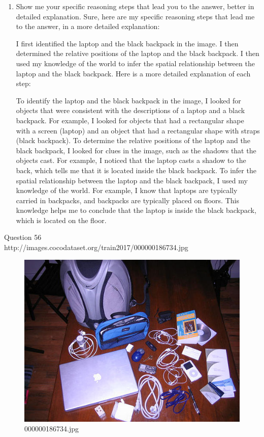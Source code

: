 \begin{enumerate}
    Here are some additional details about the spatial relationship between the laptop and the black backpack:
    
    The laptop is a computer that is used for work, school, and entertainment.
    The black backpack is a bag that is used to carry personal belongings, such as laptops, books, and clothes.
    The laptop is located inside the black backpack, meaning that it is enclosed by the backpack.
    The black backpack is located on the floor, meaning that it is not touching any walls.
    I hope this helps!
    \item Show me your specific reasoning steps that lead you to the answer, better in detailed explanation.
    \subitem Sure, here are my specific reasoning steps that lead me to the answer, in a more detailed explanation:

    I first identified the laptop and the black backpack in the image.
    I then determined the relative positions of the laptop and the black backpack.
    I then used my knowledge of the world to infer the spatial relationship between the laptop and the black backpack.
    Here is a more detailed explanation of each step:
    
    To identify the laptop and the black backpack in the image, I looked for objects that were consistent with the descriptions of a laptop and a black backpack. For example, I looked for objects that had a rectangular shape with a screen (laptop) and an object that had a rectangular shape with straps (black backpack).
    To determine the relative positions of the laptop and the black backpack, I looked for clues in the image, such as the shadows that the objects cast. For example, I noticed that the laptop casts a shadow to the back, which tells me that it is located inside the black backpack.
    To infer the spatial relationship between the laptop and the black backpack, I used my knowledge of the world. For example, I know that laptops are typically carried in backpacks, and backpacks are typically placed on floors. This knowledge helps me to conclude that the laptop is inside the black backpack, which is located on the floor.
\end{enumerate}
Question 56\\
http://images.cocodataset.org/train2017/000000186734.jpg
\begin{figure}[h]
    \centering
    \includegraphics[width=0.8\linewidth]{../image set/hard/000000186734.jpg}
    \caption{000000186734.jpg}
\end{figure}
